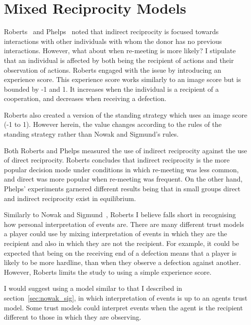 \documentclass[]{final_report}
\begin{document}
\section{Mixed Reciprocity Models}
Roberts~\cite{evoldirindir} and Phelps~\cite{phelps_game_theoretic_analysis} noted that indirect reciprocity is focused towards interactions with other individuals with whom the donor has no previous interactions. However, what about when re-meeting is more likely? I stipulate that an individual is affected by both being the recipient of actions and their observation of actions. Roberts engaged with the issue by introducing an experience score. This experience score works similarly to an image score but is bounded by -1 and 1. It increases when the individual is a recipient of a cooperation, and decreases when receiving a defection.\par
Roberts also created a version of the standing strategy which uses an image score (-1 to 1). However herein, the value changes according to the rules of the standing strategy rather than Nowak and Sigmund's rules.\par
Both Roberts and Phelps measured the use of indirect reciprocity against the use of direct reciprocity. Roberts concludes that indirect reciprocity is the more popular decision mode under conditions in which re-meeting was less common, and direct was more popular when re-meeting was frequent. On the other hand, Phelps' experiments garnered different results being that in small groups direct and indirect reciprocity exist in equilibrium.\par
Similarly to Nowak and Sigmund~\cite{evol_indirect_image}, Roberts I believe falls short in recognising how personal interpretation of events are. There are many different trust models a player could use by mixing interpretation of events in which they are the recipient and also in which they are not the recipient. For example, it could be expected that being on the receiving end of a defection means that a player is likely to be more hardline, than when they observe a defection against another. However, Roberts limits the study to using a simple experience score.\par
I would suggest using a model similar to that I described in section~\ref{sec:nowak_sig}, in which interpretation of events is up to an agents trust model. Some trust models could interpret events when the agent is the recipient different to those in which they are observing.
\end{document}
